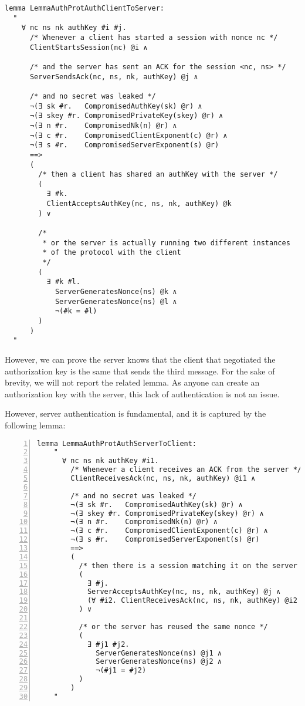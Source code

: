 \begin{lstlisting}
lemma LemmaAuthProtAuthClientToServer:
  "
    ∀ nc ns nk authKey #i #j.
      /* Whenever a client has started a session with nonce nc */
      ClientStartsSession(nc) @i ∧

      /* and the server has sent an ACK for the session <nc, ns> */
      ServerSendsAck(nc, ns, nk, authKey) @j ∧

      /* and no secret was leaked */          
      ¬(∃ sk #r.   CompromisedAuthKey(sk) @r) ∧
      ¬(∃ skey #r. CompromisedPrivateKey(skey) @r) ∧
      ¬(∃ n #r.    CompromisedNk(n) @r) ∧
      ¬(∃ c #r.    CompromisedClientExponent(c) @r) ∧
      ¬(∃ s #r.    CompromisedServerExponent(s) @r)
      ==>
      (
        /* then a client has shared an authKey with the server */
        (
          ∃ #k.
          ClientAcceptsAuthKey(nc, ns, nk, authKey) @k
        ) ∨

        /* 
         * or the server is actually running two different instances
         * of the protocol with the client
         */
        (
          ∃ #k #l.
            ServerGeneratesNonce(ns) @k ∧
            ServerGeneratesNonce(ns) @l ∧
            ¬(#k = #l)
        )
      )
  "
\end{lstlisting}

However, we can prove the server knows that the client that negotiated the authorization key is the same that sends the third message. For the sake of brevity, we will not report the related lemma. As anyone can create an authorization key with the server, this lack of authentication is not an issue.

However, server authentication is fundamental, and it is captured by the following lemma:

\newpage
\begin{lstlisting}[numbers=left]
  lemma LemmaAuthProtAuthServerToClient:
    "
      ∀ nc ns nk authKey #i1.
        /* Whenever a client receives an ACK from the server */
        ClientReceivesAck(nc, ns, nk, authKey) @i1 ∧
        
        /* and no secret was leaked */
        ¬(∃ sk #r.   CompromisedAuthKey(sk) @r) ∧
        ¬(∃ skey #r. CompromisedPrivateKey(skey) @r) ∧
        ¬(∃ n #r.    CompromisedNk(n) @r) ∧
        ¬(∃ c #r.    CompromisedClientExponent(c) @r) ∧
        ¬(∃ s #r.    CompromisedServerExponent(s) @r)
        ==>
        (
          /* then there is a session matching it on the server */
          ( 
            ∃ #j.
            ServerAcceptsAuthKey(nc, ns, nk, authKey) @j ∧
            (∀ #i2. ClientReceivesAck(nc, ns, nk, authKey) @i2 ==> #i1 = #i2)
          ) ∨

          /* or the server has reused the same nonce */
          (
            ∃ #j1 #j2.
              ServerGeneratesNonce(ns) @j1 ∧
              ServerGeneratesNonce(ns) @j2 ∧
              ¬(#j1 = #j2)
          )
        )
    "
\end{lstlisting}

